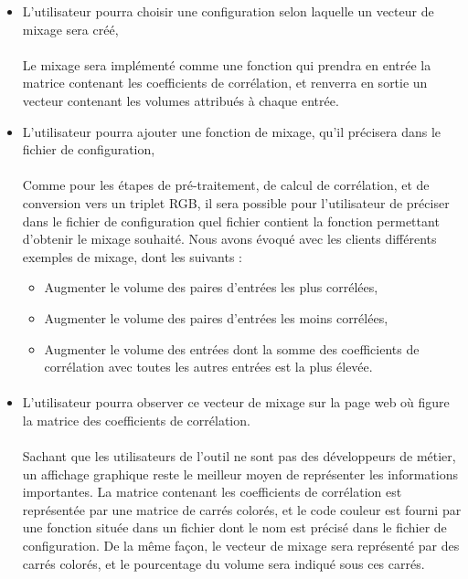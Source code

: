\documentclass{article}
\begin{document}
\begin{itemize}
	\item L'utilisateur pourra choisir une configuration selon laquelle un
	      vecteur de mixage sera créé,
	      \paragraph{}
	      Le mixage sera implémenté comme une fonction qui prendra en entrée la
	      matrice contenant les coefficients de corrélation, et renverra en sortie
	      un vecteur contenant les volumes attribués à chaque entrée.\\

	\item L'utilisateur pourra ajouter une fonction de mixage, qu'il précisera
	      dans le fichier de configuration,
	      \paragraph{}
	      Comme pour les étapes de pré-traitement, de calcul de corrélation, et de
	      conversion vers un triplet RGB, il sera possible pour l'utilisateur de
	      préciser dans le fichier de configuration quel fichier contient la
	      fonction permettant d'obtenir le mixage souhaité. Nous avons évoqué avec
	      les clients différents exemples de mixage, dont les suivants :
	      \begin{itemize}
	      	\item Augmenter le volume des paires d'entrées les plus corrélées,
	      	\item Augmenter le volume des paires d'entrées les moins corrélées,
	      	\item Augmenter le volume des entrées dont la somme des coefficients de
	      	      corrélation avec toutes les autres entrées est la plus élevée.
	      \end{itemize}
	      \paragraph{}

	\item L'utilisateur pourra observer ce vecteur de mixage sur la page
	      web où figure la matrice des coefficients de corrélation.
	      \paragraph{}
	      Sachant que les utilisateurs de l'outil ne sont pas des développeurs de
	      métier, un affichage graphique reste le meilleur moyen de représenter les
	      informations importantes. La matrice contenant les coefficients de
	      corrélation est représentée par une matrice de carrés colorés, et le
	      code couleur est fourni par une fonction située dans un fichier dont le
	      nom est précisé dans le fichier de configuration. De la même façon, le
	      vecteur de mixage sera représenté par des carrés colorés, et le
	      pourcentage du volume sera indiqué sous ces carrés.\\


\end{itemize}
\end{document}
